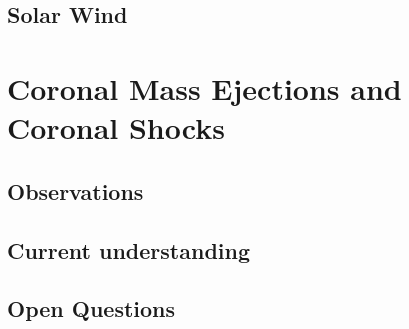 \subsection{Solar Wind}\label{sec:13}





\section{Coronal Mass Ejections and Coronal Shocks}\label{sec:2}

\subsection{Observations}\label{sec:20}

\subsection{Current understanding}\label{sec:21}

\subsection{Open Questions}\label{sec:22}






